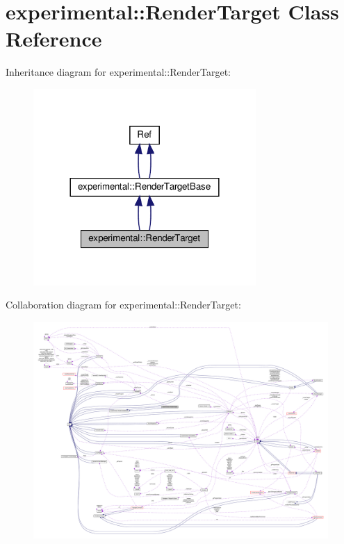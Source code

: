 \hypertarget{classexperimental_1_1RenderTarget}{}\section{experimental\+:\+:Render\+Target Class Reference}
\label{classexperimental_1_1RenderTarget}


Inheritance diagram for experimental\+:\+:Render\+Target\+:
\nopagebreak
\begin{figure}[H]
\begin{center}
\leavevmode
\includegraphics[width=240pt]{classexperimental_1_1RenderTarget__inherit__graph}
\end{center}
\end{figure}


Collaboration diagram for experimental\+:\+:Render\+Target\+:
\nopagebreak
\begin{figure}[H]
\begin{center}
\leavevmode
\includegraphics[width=350pt]{classexperimental_1_1RenderTarget__coll__graph}
\end{center}
\end{figure}
